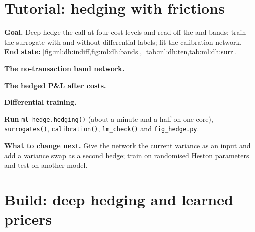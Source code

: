 \section{Tutorial: hedging with frictions}\label{tut:ml:deep-hedging-and-machine-learning-in-pricing:tut}

\begin{tutorial}
\textbf{Goal.} Deep-hedge the call at four cost levels and read off the  and bands; train the surrogate with
and without differential labels; fit the calibration network. \textbf{End state:}
\cref{fig:ml:dh:indiff,fig:ml:dh:bands}, \cref{tab:ml:dh:ten,tab:ml:dh:surr}.
\begin{tutsteps}
\item \textbf{The no-transaction band network.}
\label{lst:ml:dh:band}
\item \textbf{The hedged P\&L after costs.}
\label{lst:ml:dh:pnl}
\item \textbf{Differential training.}
\label{lst:ml:dh:surr}
\item \textbf{Run} \texttt{ml\_hedge.hedging()} (about a minute and a half on one core), \texttt{surrogates()},
\texttt{calibration()}, \texttt{lm\_check()} and \texttt{fig\_hedge.py}.
\end{tutsteps}
\textbf{What to change next.} Give the network the current variance as an input and add a variance swap as a second hedge;
train on randomised Heston parameters and test on another model.
\end{tutorial}

\section{Build: deep hedging and learned pricers}\label{bld:ml:deep-hedging-and-machine-learning-in-pricing:deephedge}

